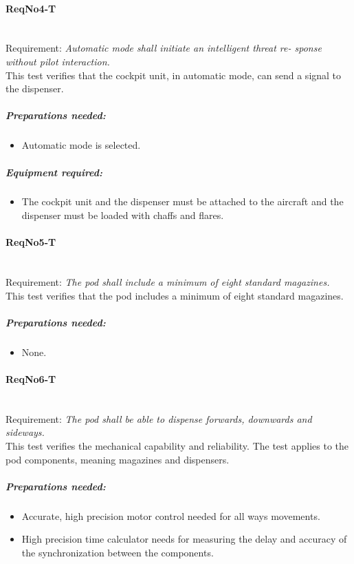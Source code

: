 \paragraph{ReqNo4-T}\mbox{}\\ %
Requirement: \textit{Automatic mode shall initiate an intelligent threat re-
sponse without pilot interaction.}\\
This test verifies that the cockpit unit, in automatic mode, can send a signal to the dispenser.

	\subparagraph{Preparations needed:}
	\begin{itemize}
	\item Automatic mode is selected.
	\end{itemize}
	
	\subparagraph{Equipment required:}
	\begin{itemize}
	\item The cockpit unit and the dispenser must be attached to the aircraft and the dispenser must be loaded with chaffs and flares.
	\end{itemize}	

\paragraph{ReqNo5-T}\mbox{}\\ %
Requirement: \textit{The pod shall include a minimum of eight standard magazines.}\\
This test verifies that the pod includes a minimum of eight standard magazines.
	\subparagraph{Preparations needed:}
	\begin{itemize}
	\item None.
	\end{itemize}

\paragraph{ReqNo6-T}\mbox{}\\ %
Requirement: \textit{The pod shall be able to dispense forwards, downwards and sideways.}\\
This test verifies the mechanical capability and reliability. The test applies to the pod components, meaning magazines and dispensers.
	\subparagraph{Preparations needed:}
	\begin{itemize}
	\item Accurate, high precision motor control needed for all ways movements.
	\item High precision time calculator needs for measuring the delay and accuracy of the synchronization between the components.
	\end{itemize}

